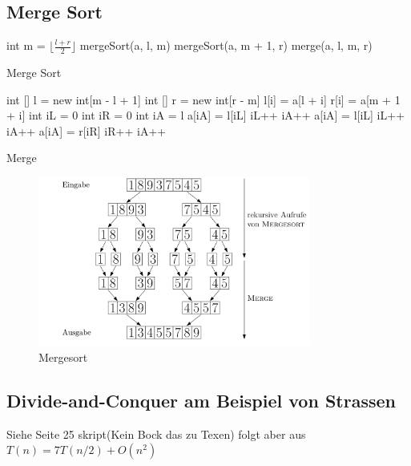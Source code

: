 \documentclass{report}
\begin{document}
\subsection{Merge Sort}
\begin{algorithm}[H]
	 {
		int m = $\lfloor \frac{l + r}{2} \rfloor$\;
		mergeSort(a, l, m)\;
		mergeSort(a, m + 1, r)\;
		merge(a, l, m, r)\;
	}
	\caption[short]{Merge Sort}
\end{algorithm}
\begin{algorithm}[H]
	int [] l = new int[m - l + 1]\;
	int [] r = new int[r - m]\; 
	 {
		l[i] = a[l + i]\;
	}
	 {
		r[i] = a[m + 1 + i]\;
	}
	int iL = 0\;
	int iR = 0\;
	int iA = l\;
	 {
		 {
			a[iA] = l[iL]\;
			iL++\;
			iA++\;
		} 
		 {
			a[iA] = l[iL]\;
			iL++\;
			iA++\;
		}
		 {
			a[iA] = r[iR]\;
			iR++\;
			iA++\;
		}
	}

	\caption[short]{Merge}
\end{algorithm}
\begin{figure}[h]
	\centering
	\includegraphics[width=0.8\textwidth]{images/IMG_86CA0912DB1F-1.jpeg}
	\caption{Mergesort}
	\label{fig:1}
\end{figure}
\subsection{Divide-and-Conquer am Beispiel von Strassen}
\begin{myproof}
	Siehe Seite 25 skript(Kein Bock das zu Texen) folgt aber aus $T(n) = 7T(n/2) + O(n^2)$
\end{myproof}
\end{document}
